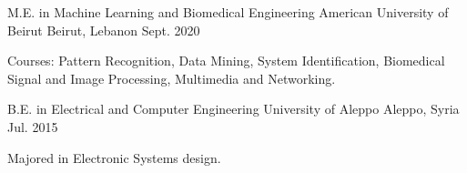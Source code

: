 

\begin{cventries}

  \cventry
    {M.E. in Machine Learning and Biomedical Engineering} %
    {American University of Beirut} %
    {Beirut, Lebanon} %
    {Sept. 2020} %
    {
      \begin{cvitems} %
        \item {Courses: Pattern Recognition, Data Mining, System Identification, Biomedical Signal and Image Processing, \mbox{Multimedia} and Networking.}
      \end{cvitems}
    }

  \cventry
    {B.E. in Electrical and Computer Engineering} %
    {University of Aleppo} %
    {Aleppo, Syria} %
    {Jul. 2015} %
    {
        \begin{cvitems} %
        \item {Majored in Electronic Systems design.} 
        \end{cvitems}
    }
    

\end{cventries}

